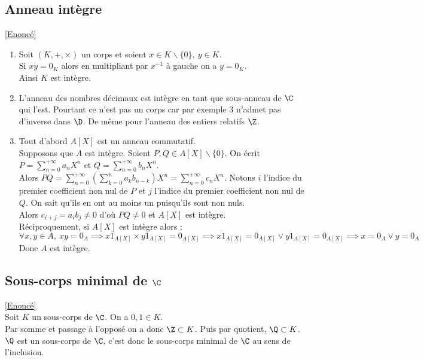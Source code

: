 \documentclass[8pt]{book}
\begin{document}
	\subsection{Anneau intègre }
	\label{Anneau intègre corrigé}
	\textcolor{blue}{\hyperref[Anneau intègre]{[Enoncé]}}\\
	\begin{enumerate}[leftmargin=*]
		\item Soit $(K,+,\times)$ un corps et soient $x\in K\backslash\{0\},\ y\in K$.\\
		Si $xy=0_K$ alors en multipliant par $x^{-1}$ à gauche on a $y=0_K$.\\
		Ainsi $K$ est intègre.
		\item L'anneau des nombres décimaux est intègre en tant que sous-anneau de $\C$ qui l'est. Pourtant ce n'est pas un corps car par exemple $3$ n'admet pas d'inverse dans $\D$. De même pour l'anneau des entiers relatifs $\Z$.
		\item Tout d'abord $A[X]$ est un anneau commutatif.\\
		Supposons que $A$ est intègre. Soient $P,Q\in A[X]\backslash\{0\}$. On écrit $P=\displaystyle\sum_{n=0}^{+\infty}a_nX^n$ et $Q=\displaystyle\sum_{n=0}^{+\infty}b_nX^n$.\\
		Alors $PQ=\displaystyle\sum_{n=0}^{+\infty}\left(\sum_{k=0}^na_kb_{n-k}\right)X^n=\sum_{n=0}^{+\infty}c_nX^n$. Notons $i$ l'indice du premier coefficient non nul de $P$ et $j$ l'indice du premier coefficient non nul de $Q$. On sait qu'ils en ont au moins un puisqu'ils sont non nuls.\\
		Alors $c_{i+j}=a_ib_j\ne 0$ d'où $PQ\ne 0$ et $A[X]$ est intègre.\\
		Réciproquement, si $A[X]$ est intègre alors :
		$$\forall x,y\in A,\ xy=0_A\implies x1_{A[X]}\times y1_{A[X]}=0_{A[X]}\implies x1_{A[X]}=0_{A[X]}\vee y1_{A[X]}=0_{A[X]}\implies x=0_A\vee y=0_A$$
		Donc $A$ est intègre.
	\end{enumerate}
	
	\subsection{Sous-corps minimal de $\C$ }
	\label{Sous-corps minimal de C corrigé}
	\textcolor{blue}{\hyperref[Sous-corps minimal de C]{[Enoncé]}}\\
	Soit $K$ un sous-corps de $\C$. On a $0,1\in K$.\\
	Par somme et passage à l'opposé on a donc $\Z\subset K$. Puis par quotient, $\Q\subset K$.\\
	$\Q$ est un sous-corps de $\C$, c'est donc le sous-corps minimal de $\C$ au sens de l'inclusion.
	
\end{document}
